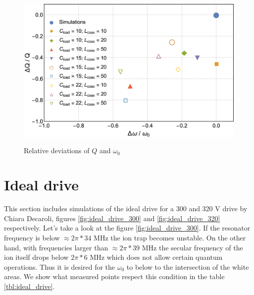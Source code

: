 \begin{figure}[h]
	\centering
	\includegraphics[width=\textwidth]{images/Q_w_plot}
	\label{fig:Q_w_deviation}
	\caption{Relative deviations of $Q$ and $\omega_0$}
\end{figure}

\section{Ideal drive}
This section includes simulations of the ideal drive for a 300 and 320 V drive by Chiara Decaroli, figures \ref{fig:ideal_drive_300} and \ref{fig:ideal_drive_320} respectively. Let's take a look at the figure \ref{fig:ideal_drive_300}. If the resonator frequency is below $\approx 2\pi*34$ MHz the ion trap becomes unstable. On the other hand, with frequencies larger than $\approx 2\pi*39$ MHz the secular frequency of the ion itself drops below $2\pi*6$ MHz which does not allow certain quantum operations. Thus it is desired for the $\omega_0$ to below to the intersection of the white areas. We show what measured points respect this condition in the table \ref{tbl:ideal_drive}.

